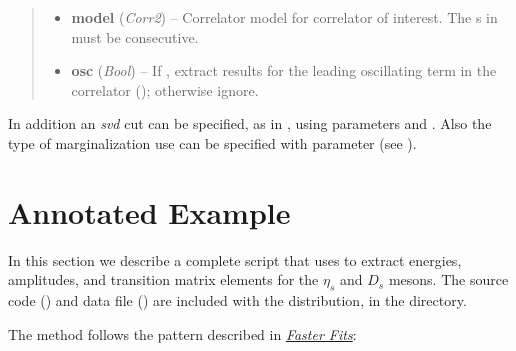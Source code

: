 \documentclass[letterpaper,10pt,english]{sphinxmanual}
\begin{document}
\begin{fulllineitems}
\begin{quote}
\begin{description}
\begin{itemize}
\item {} 
\textbf{model} (\emph{Corr2}) -- Correlator model for correlator of interest. The s
in  must be consecutive.

\item {} 
\textbf{osc} (\emph{Bool}) -- If , extract results for the leading oscillating
term in the correlator (); otherwise ignore.

\end{itemize}

\end{description}\end{quote}

In addition an \emph{svd} cut can be specified, as in {\hyperref[corrfitter:corrfitter.CorrFitter]{}}, using
parameters  and . Also the type of marginalization
use can be specified with parameter  (see {\hyperref[corrfitter:corrfitter.CorrFitter]{}}).

\end{fulllineitems}



\section{Annotated Example}
\label{corrfitter:annotated-example}\label{corrfitter:id2}
In this section we describe a complete script that uses  to
extract energies, amplitudes, and transition matrix elements for  the
$\eta_s$ and $D_s$ mesons. The source code () and
data file () are included with the 
distribution, in the  directory.

The  method follows the pattern described in {\hyperref[corrfitter:faster-fits]{\emph{Faster Fits}}}:
\end{document}
